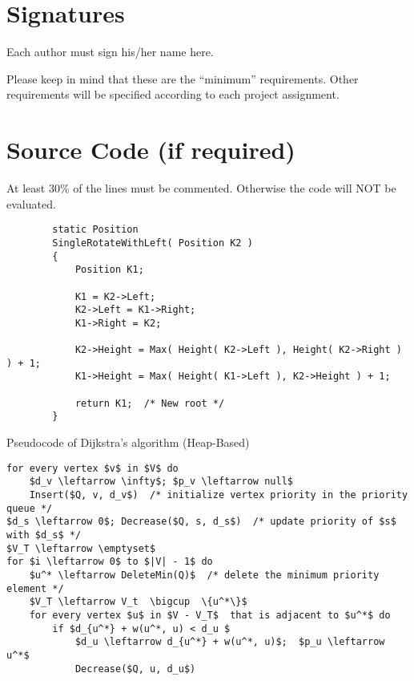 \documentclass[twoside]{article}
\begin{document}
\begin{CJK*}{UTF8}{gbsn}
\section{Signatures}

Each author must sign his/her name here.

\vskip 1.5in


Please keep in mind that these are the “minimum” requirements.  Other requirements will be specified according to each project assignment.
\newpage


%


\appendix 
\section{Source Code (if required)}
At least 30\% of the lines must be commented.  Otherwise the code will NOT be evaluated.

\begin{lstlisting}
        static Position
        SingleRotateWithLeft( Position K2 )
        {
            Position K1;

            K1 = K2->Left;
            K2->Left = K1->Right;
            K1->Right = K2;

            K2->Height = Max( Height( K2->Left ), Height( K2->Right ) ) + 1;
            K1->Height = Max( Height( K1->Left ), K2->Height ) + 1;

            return K1;  /* New root */
        }
\end{lstlisting}

Pseudocode of Dijkstra's algorithm (Heap-Based)
\begin{lstlisting}[mathescape=true]
for every vertex $v$ in $V$ do 
    $d_v \leftarrow \infty$; $p_v \leftarrow null$
    Insert($Q, v, d_v$)  /* initialize vertex priority in the priority queue */
$d_s \leftarrow 0$; Decrease($Q, s, d_s$)  /* update priority of $s$ with $d_s$ */
$V_T \leftarrow \emptyset$
for $i \leftarrow 0$ to $|V| - 1$ do
    $u^* \leftarrow DeleteMin(Q)$  /* delete the minimum priority element */
    $V_T \leftarrow V_t  \bigcup  \{u^*\}$
    for every vertex $u$ in $V - V_T$  that is adjacent to $u^*$ do
        if $d_{u^*} + w(u^*, u) < d_u $
            $d_u \leftarrow d_{u^*} + w(u^*, u)$;  $p_u \leftarrow u^*$
            Decrease($Q, u, d_u$)
\end{lstlisting}

\end{CJK*} 
\end{document}
